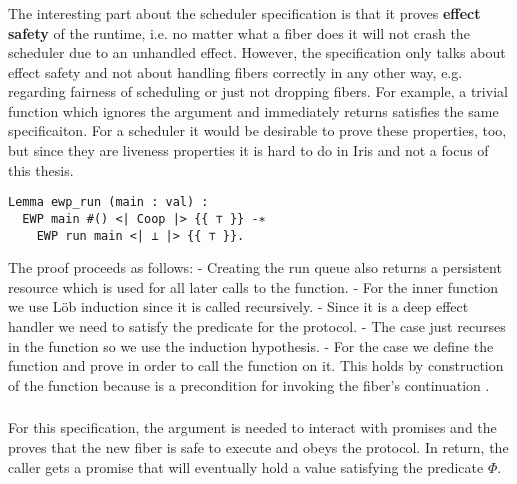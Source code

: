\subsubsection{}
\label{sec:sched-spec-run}

The interesting part about the scheduler specification is that it proves \textbf{effect safety} of the runtime, i.e. no matter what a fiber does it will not crash the scheduler due to an unhandled effect.
However, the specification only talks about effect safety and not about handling fibers correctly in any other way, e.g. regarding fairness of scheduling or just not dropping fibers.
For example, a trivial function which ignores the  argument and immediately returns satisfies the same specificaiton.
For a scheduler it would be desirable to prove these properties, too, but since they are liveness properties it is hard to do in Iris and not a focus of this thesis.

\begin{verbatim}
Lemma ewp_run (main : val) :
  EWP main #() <| Coop |> {{ ⊤ }} -∗
    EWP run main <| ⊥ |> {{ ⊤ }}.
\end{verbatim}

The proof proceeds as follows:
- Creating the run queue also returns a persistent resource which is used for all later calls to the  function.
- For the inner \efork{} function we use Löb induction since it is called recursively.
- Since it is a deep effect handler we need to satisfy the  predicate for the  protocol.
- The \efork{} case just recurses in the \efork{} function so we use the induction hypothesis.
- For the \esuspend{} case we define the  function and prove  in order to call the  function on it.
This holds by construction of the  function because  is a precondition for invoking the fiber's continuation .

\subsubsection{}
\label{sec:sched-spec-fork}

For this specification, the \gsPInv{} argument is needed to interact with promises and the \ewpt{} proves that the new fiber is safe to execute and obeys the  protocol.
In return, the caller gets a promise that will eventually hold a value satisfying the predicate \(Φ\).

